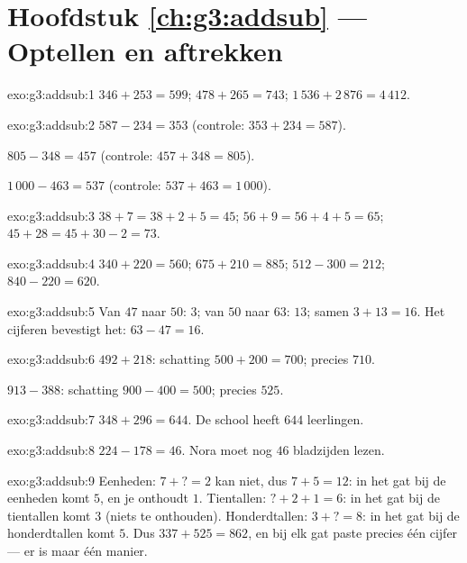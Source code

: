 \section*{Hoofdstuk \ref{ch:g3:addsub} --- Optellen en aftrekken}

\begin{solution}{exo:g3:addsub:1}
$346 + 253 = 599$; \quad
$478 + 265 = 743$; \quad
$1\,536 + 2\,876 = 4\,412$.
\end{solution}

\begin{solution}{exo:g3:addsub:2}
$587 - 234 = 353$ (controle: $353 + 234 = 587$).

$805 - 348 = 457$ (controle: $457 + 348 = 805$).

$1\,000 - 463 = 537$ (controle: $537 + 463 = 1\,000$).
\end{solution}

\begin{solution}{exo:g3:addsub:3}
$38 + 7 = 38 + 2 + 5 = 45$; \quad
$56 + 9 = 56 + 4 + 5 = 65$; \quad
$45 + 28 = 45 + 30 - 2 = 73$.
\end{solution}

\begin{solution}{exo:g3:addsub:4}
$340 + 220 = 560$; \quad $675 + 210 = 885$; \quad
$512 - 300 = 212$; \quad $840 - 220 = 620$.
\end{solution}

\begin{solution}{exo:g3:addsub:5}
Van $47$ naar $50$: $3$; van $50$ naar $63$: $13$; samen
$3 + 13 = 16$. Het cijferen bevestigt het: $63 - 47 = 16$.
\end{solution}

\begin{solution}{exo:g3:addsub:6}
$492 + 218$: schatting $500 + 200 = 700$; precies $710$.

$913 - 388$: schatting $900 - 400 = 500$; precies $525$.
\end{solution}

\begin{solution}{exo:g3:addsub:7}
$348 + 296 = 644$. De school heeft $644$ leerlingen.
\end{solution}

\begin{solution}{exo:g3:addsub:8}
$224 - 178 = 46$. Nora moet nog $46$ bladzijden lezen.
\end{solution}

\begin{solution}{exo:g3:addsub:9}
Eenheden: $7 + \text{?} = 2$ kan niet, dus $7 + 5 = 12$: in het gat bij
de eenheden komt $5$, en je onthoudt $1$. Tientallen:
$\text{?} + 2 + 1 = 6$: in het gat bij de tientallen komt $3$ (niets te
onthouden). Honderdtallen: $3 + \text{?} = 8$: in het gat bij de
honderdtallen komt $5$. Dus $337 + 525 = 862$, en bij elk gat paste
precies één cijfer --- er is maar één manier.
\end{solution}

